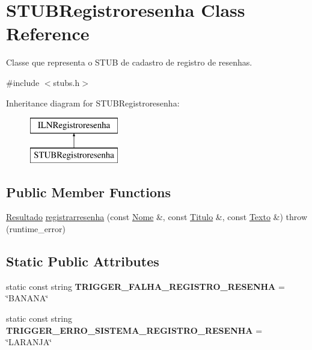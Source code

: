 \hypertarget{classSTUBRegistroresenha}{}\section{S\+T\+U\+B\+Registroresenha Class Reference}
\label{classSTUBRegistroresenha}


Classe que representa o S\+T\+UB de cadastro de registro de resenhas.  




{\ttfamily \#include $<$stubs.\+h$>$}

Inheritance diagram for S\+T\+U\+B\+Registroresenha\+:\begin{figure}[H]
\begin{center}
\leavevmode
\includegraphics[height=2.000000cm]{classSTUBRegistroresenha}
\end{center}
\end{figure}
\subsection*{Public Member Functions}
\begin{DoxyCompactItemize}
\item 
\hyperlink{classResultado}{Resultado} \hyperlink{classSTUBRegistroresenha_a98762ff953cb017d00a225a0772b6394}{registrarresenha} (const \hyperlink{classNome}{Nome} \&, const \hyperlink{classTitulo}{Titulo} \&, const \hyperlink{classTexto}{Texto} \&)  throw (runtime\+\_\+error)
\end{DoxyCompactItemize}
\subsection*{Static Public Attributes}
\begin{DoxyCompactItemize}
\item 
\mbox{\label{classSTUBRegistroresenha_a94328e1c8f7e2e0e6d6483364e2ab68a}} 
static const string {\bfseries T\+R\+I\+G\+G\+E\+R\+\_\+\+F\+A\+L\+H\+A\+\_\+\+R\+E\+G\+I\+S\+T\+R\+O\+\_\+\+R\+E\+S\+E\+N\+HA} = \char`\"{}B\+A\+N\+A\+NA\char`\"{}
\item 
\mbox{\label{classSTUBRegistroresenha_aaa64d45e5b6a55ec5554d3b764d04e74}} 
static const string {\bfseries T\+R\+I\+G\+G\+E\+R\+\_\+\+E\+R\+R\+O\+\_\+\+S\+I\+S\+T\+E\+M\+A\+\_\+\+R\+E\+G\+I\+S\+T\+R\+O\+\_\+\+R\+E\+S\+E\+N\+HA} = \char`\"{}L\+A\+R\+A\+N\+JA\char`\"{}
\end{DoxyCompactItemize}


